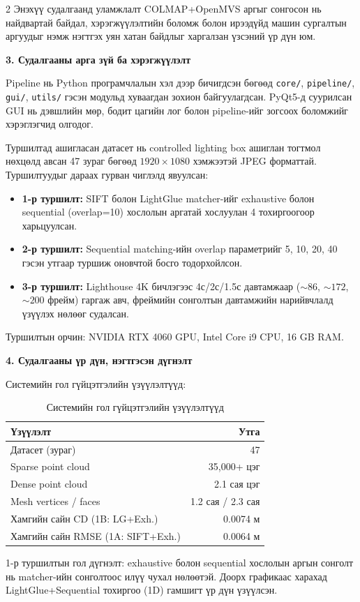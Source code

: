 \begin{multicols}{2}
Энэхүү судалгаанд уламжлалт COLMAP+OpenMVS аргыг сонгосон нь найдвартай байдал, хэрэгжүүлэлтийн боломж болон ирээдүйд машин сургалтын аргуудыг нэмж нэгтгэх уян хатан байдлыг харгалзан үзсэний үр дүн юм.

\noindent\textbf{3. Судалгааны арга зүй ба хэрэгжүүлэлт}

Pipeline нь Python програмчлалын хэл дээр бичигдсэн бөгөөд \texttt{core/}, \texttt{pipeline/}, \texttt{gui/}, \texttt{utils/} гэсэн модульд хуваагдан зохион байгуулагдсан. PyQt5-д суурилсан GUI нь дэвшлийн мөр, бодит цагийн лог болон pipeline-ийг зогсоох боломжийг хэрэглэгчид олгодог.

Туршилтад ашигласан датасет нь controlled lighting box ашиглан тогтмол нөхцөлд авсан 47 зураг бөгөөд $1920\times1080$ хэмжээтэй JPEG форматтай. Туршилтуудыг дараах гурван чиглэлд явуулсан:

\begin{itemize}
    \item \textbf{1-р туршилт:} SIFT болон LightGlue matcher-ийг exhaustive болон sequential (overlap=10) хослолын аргатай хослуулан 4 тохиргоогоор харьцуулсан.
    \item \textbf{2-р туршилт:} Sequential matching-ийн overlap параметрийг 5, 10, 20, 40 гэсэн утгаар туршиж оновчтой босго тодорхойлсон.
    \item \textbf{3-р туршилт:} Lighthouse 4K бичлэгээс 4с/2с/1.5с давтамжаар (${\sim}86$, ${\sim}172$, ${\sim}200$ фрейм) гаргаж авч, фреймийн сонголтын давтамжийн нарийвчлалд үзүүлэх нөлөөг судалсан.
\end{itemize}

Туршилтын орчин: NVIDIA RTX 4060 GPU, Intel Core i9 CPU, 16 GB RAM.

\noindent\textbf{4. Судалгааны үр дүн, нэгтгэсэн дүгнэлт}

Системийн гол гүйцэтгэлийн үзүүлэлтүүд:

\begin{table}[H]
\centering
\caption{Системийн гол гүйцэтгэлийн үзүүлэлтүүд}
\label{tab:tovchlol_results}
\scriptsize
\setlength{\tabcolsep}{3pt}
\begin{tabular}{|l|r|}
\hline
\textbf{Үзүүлэлт} & \textbf{Утга} \\ \hline
Датасет (зураг) & 47 \\ \hline
Sparse point cloud & 35{,}000+ цэг \\ \hline
Dense point cloud & 2.1 сая цэг \\ \hline
Mesh vertices / faces & 1.2 сая / 2.3 сая \\ \hline
Хамгийн сайн CD (1B: LG+Exh.) & 0.0074 м \\ \hline
Хамгийн сайн RMSE (1A: SIFT+Exh.) & 0.0064 м \\ \hline
\end{tabular}
\end{table}

1-р туршилтын гол дүгнэлт: exhaustive болон sequential хослолын аргын сонголт нь matcher-ийн сонголтоос илүү чухал нөлөөтэй. Доорх графикаас харахад LightGlue+Sequential тохиргоо (1D) гамшигт үр дүн үзүүлсэн.
\end{multicols}

